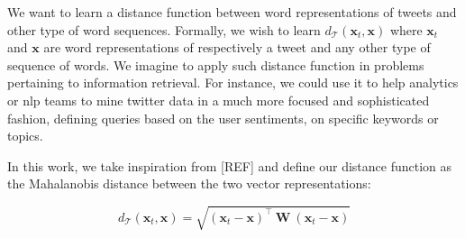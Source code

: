 \documentclass[letterpaper]{article}
\begin{document}
We want to learn a distance function between word representations of tweets and other type of word sequences. Formally, we wish to learn $d_{\mathcal{T}} (\mathbf{x}_t, \mathbf{x})$ where $\mathbf{x}_t$ and $\mathbf{x}$ are word representations of respectively a tweet and any other type of sequence of words. We imagine to apply such distance function in problems pertaining to information retrieval. For instance, we could use it to help analytics or nlp teams to mine twitter data in a much more focused and sophisticated fashion, defining queries based on the user sentiments, on specific keywords or topics. 

In this work, we take inspiration from [REF] and define our distance function as the Mahalanobis distance between the two vector representations: 

\begin{equation}
d_{\mathcal{T}} (\mathbf{x}_t, \mathbf{x}) = \sqrt{  (\mathbf{x}_t - \mathbf{x})^{\intercal}\ \mathbf{W}\ (\mathbf{x}_t - \mathbf{x})}
\end{equation}



\end{document}
